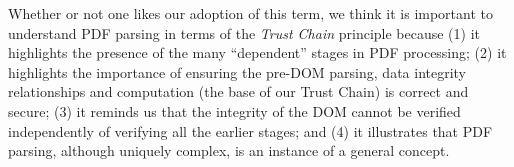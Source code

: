 
Whether or not one likes our adoption of this term,
we think it is important to understand PDF parsing in terms of the
\emph{Trust Chain} principle because
%
(1) it highlights the presence of the many ``dependent'' stages
in PDF processing;
%
(2) it highlights the importance of ensuring the pre-DOM parsing, data integrity relationships and
computation (the base of our Trust Chain) is correct and secure;
%
(3) it reminds us that the integrity of the DOM cannot be verified
independently of verifying all the earlier stages; and
%
(4) it illustrates that PDF parsing, although uniquely complex, is an instance of
a general concept.

